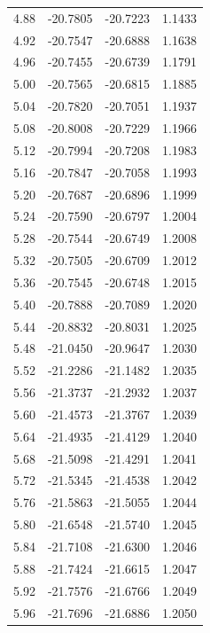 \documentclass[floatfix,traditabstract,preprint2]{aa}
\begin{document}
\begin{table}[!htbp]
\begin{tabular}{c  c c c}
4.88 & -20.7805 & -20.7223 & 1.1433\\
4.92 & -20.7547 & -20.6888 & 1.1638\\
4.96 & -20.7455 & -20.6739 & 1.1791\\
5.00 & -20.7565 & -20.6815 & 1.1885\\
5.04 & -20.7820 & -20.7051 & 1.1937\\
5.08 & -20.8008 & -20.7229 & 1.1966\\
5.12 & -20.7994 & -20.7208 & 1.1983\\
5.16 & -20.7847 & -20.7058 & 1.1993\\
5.20 & -20.7687 & -20.6896 & 1.1999\\
5.24 & -20.7590 & -20.6797 & 1.2004\\
5.28 & -20.7544 & -20.6749 & 1.2008\\
5.32 & -20.7505 & -20.6709 & 1.2012\\
5.36 & -20.7545 & -20.6748 & 1.2015\\
5.40 & -20.7888 & -20.7089 & 1.2020\\
5.44 & -20.8832 & -20.8031 & 1.2025\\
5.48 & -21.0450 & -20.9647 & 1.2030\\
5.52 & -21.2286 & -21.1482 & 1.2035\\
5.56 & -21.3737 & -21.2932 & 1.2037\\
5.60 & -21.4573 & -21.3767 & 1.2039\\
5.64 & -21.4935 & -21.4129 & 1.2040\\
5.68 & -21.5098 & -21.4291 & 1.2041\\
5.72 & -21.5345 & -21.4538 & 1.2042\\
5.76 & -21.5863 & -21.5055 & 1.2044\\
5.80 & -21.6548 & -21.5740 & 1.2045\\
5.84 & -21.7108 & -21.6300 & 1.2046\\
5.88 & -21.7424 & -21.6615 & 1.2047\\
5.92 & -21.7576 & -21.6766 & 1.2049\\
5.96 & -21.7696 & -21.6886 & 1.2050\\
\end{tabular}
\end{table}  
\end{document}
